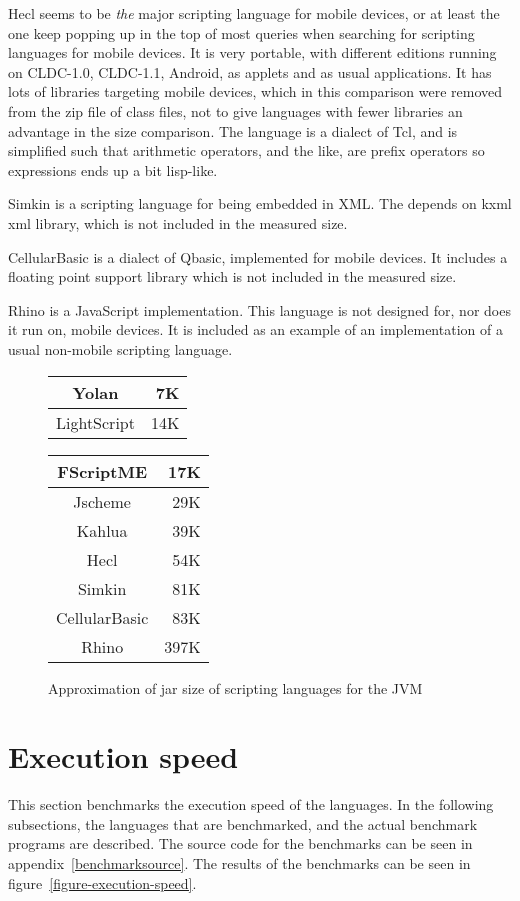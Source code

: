Hecl\cite{hecl} seems to be \emph{the} major scripting language for mobile devices, or at least the one keep popping up in the top of most queries when searching for scripting languages for mobile devices.
It is very portable, with different editions running on CLDC-1.0, CLDC-1.1, Android, as applets and as usual applications.
It has lots of libraries targeting mobile devices, which in this comparison were removed from the zip file of class files, not to give languages with fewer libraries an advantage in the size comparison.
The language is a dialect of Tcl, and is simplified such that arithmetic operators, and the like, are prefix operators so expressions ends up a bit lisp-like.

Simkin\cite{simkin} is a scripting language for being embedded in XML. The depends on kxml xml library, which is not included in the measured size. 

CellularBasic\cite{cellularbasic} is a dialect of Qbasic, implemented for mobile devices. 
It includes a floating point support library which is not included in the measured size. 

Rhino\cite{rhino} is a JavaScript implementation. This language is not designed for, nor does it run on, mobile devices. It is included as an example of an implementation of a usual non-mobile scripting language.

\begin{figure} \begin{center}
\begin{tabular}{|c|r|} \hline 
Yolan & 7K \\ \hline 
LightScript & 14K \\ \hline 
\end{tabular}
\begin{tabular}{|c|r|} \hline 
FScriptME & 17K \\ \hline 
Jscheme & 29K \\ \hline 
Kahlua & 39K \\ \hline 
Hecl & 54K \\ \hline 
Simkin & 81K \\ \hline 
CellularBasic & 83K \\ \hline 
Rhino & 397K \\ \hline 
\end{tabular}
\end{center}
\caption{Approximation of jar size of scripting languages for the JVM}
\end{figure}

\section{Execution speed}
This section benchmarks the execution speed of the languages. 
In the following subsections, the languages that are benchmarked, and the actual benchmark programs are described.
The source code for the benchmarks can be seen in appendix~\ref{benchmarksource}.
The results of the benchmarks can be seen in figure~\ref{figure-execution-speed}.

